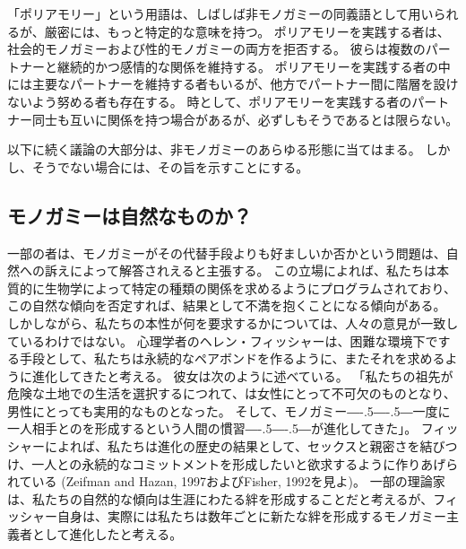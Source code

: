 \documentclass[paper=a4,book,openany]{jlreq}
\def\DDASH{―\kern-.5\zw―\kern-.5\zw―} %
\begin{document}
「ポリアモリー」という用語は、しばしば非モノガミーの同義語として用いられるが、厳密には、もっと特定的な意味を持つ。
ポリアモリーを実践する者は、社会的モノガミーおよび性的モノガミーの両方を拒否する。
彼らは複数のパートナーと継続的かつ感情的な関係を維持する。
ポリアモリーを実践する者の中には主要なパートナーを維持する者もいるが、他方でパートナー間に階層を設けないよう努める者も存在する。
時として、ポリアモリーを実践する者のパートナー同士も互いに関係を持つ場合があるが、必ずしもそうであるとは限らない。

以下に続く議論の大部分は、非モノガミーのあらゆる形態に当てはまる。
しかし、そうでない場合には、その旨を示すことにする。

\subsection{モノガミーは自然なものか？}

一部の者は、モノガミーがその代替手段よりも好ましいか否かという問題は、自然への訴えによって解答されえると主張する。
この立場によれば、私たちは本質的に生物学によって特定の種類の関係を求めるようにプログラムされており、この自然な傾向を否定すれば、結果として不満を抱くことになる傾向がある。
しかしながら、私たちの本性が何を要求するかについては、人々の意見が一致しているわけではない。
心理学者のヘレン・フィッシャーは、困難な環境下でする手段として、私たちは永続的なペアボンドを作るように、またそれを求めるように進化してきたと考える。
彼女は次のように述べている。
「私たちの祖先が危険な土地での生活を選択するにつれて、は女性にとって不可欠のものとなり、男性にとっても実用的なものとなった。
そして、モノガミー{\DDASH}一度に一人相手とのを形成するという人間の慣習{\DDASH}が進化してきた」\citep[p.131]{fisher04:_why_we_love}。
フィッシャーによれば、私たちは進化の歴史の結果として、セックスと親密さを結びつけ、一人との永続的なコミットメントを形成したいと欲求するように作りあげられている
(Zeifman and Hazan, 1997およびFisher, 1992を見よ)。
\nocite{zeifman97:_proces_model_adult_attac_format}\nocite{fisher92:_anatom_love}
一部の理論家は、私たちの自然的な傾向は生涯にわたる絆を形成することだと考えるが、フィッシャー自身は、実際には私たちは数年ごとに新たな絆を形成するモノガミー主義者として進化したと考える。
\end{document}
